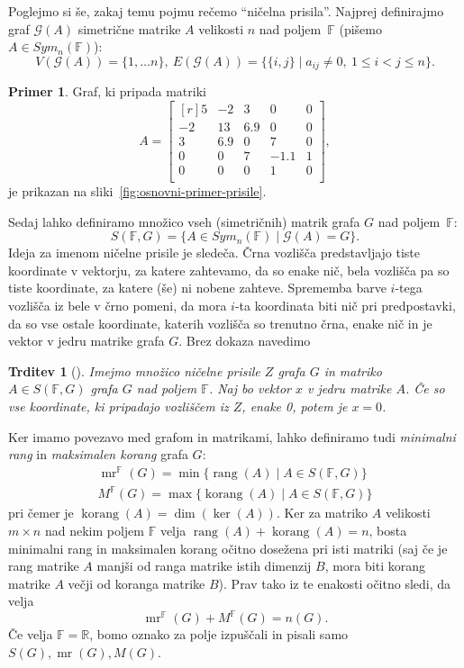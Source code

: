 \documentclass[12pt,a4paper,twoside]{article}
\theoremstyle{definition} %
\newtheorem{primer}[definicija]{Primer}
\theoremstyle{plain} %
\newtheorem{trditev}[definicija]{Trditev}
\numberwithin{equation}{section}  %
\newcommand{\R}{\mathbb R}
\newcommand{\F}{\mathbb F}
\renewcommand{\G}{\mathcal{G}}
\DeclareMathOperator{\mr}{mr}
\DeclareMathOperator{\rang}{rang}
\DeclareMathOperator{\korang}{korang}
\begin{document}
Poglejmo si še, zakaj temu pojmu rečemo ``ničelna prisila''. Najprej definirajmo graf $\G(A)$ simetrične matrike $A$ velikosti $n$ nad poljem~$\F$ (pišemo $A \in Sym_n(\F)$):
\[ V(\G(A)) = \{1, \ldots n\},\ E(\G(A)) = \{\{i,j\} \mid a_{ij} \neq 0,\ 1 \leq i < j \leq n \}. \]
\begin{primer}
    Graf, ki pripada matriki \[ A = \begin{bmatrix*}[r]
    5 & -2 & 3 & 0 & 0 \\
    -2 & 13 & 6.9 & 0 & 0 \\
    3 & 6.9 & 0 & 7 & 0 \\
    0 & 0 & 7 & -1.1 & 1 \\
    0 & 0 & 0 & 1 & 0 \\
    \end{bmatrix*},\] je prikazan na sliki~\ref{fig:osnovni-primer-prisile}.
\end{primer}
Sedaj lahko definiramo množico vseh (simetričnih) matrik grafa $G$ nad poljem~$\F$:
\[ S(\F, G) = \{A \in Sym_n(\F) \mid \G(A) = G \}. \]
Ideja za imenom ničelne prisile je sledeča. Črna vozlišča predstavljajo tiste koordinate v vektorju, za katere zahtevamo, da so enake nič, bela vozlišča pa so tiste koordinate, za katere (še) ni nobene zahteve. Sprememba barve $i$-tega vozlišča iz bele v črno pomeni, da mora $i$-ta koordinata biti nič pri predpostavki, da so vse ostale koordinate, katerih vozlišča so trenutno črna, enake nič in je vektor v jedru matrike grafa $G$. Brez dokaza navedimo
\begin{trditev}[{\cite[trditev 2.3]{aim2008minimumrank}}]
    \label{trd:rang2}
    Imejmo množico ničelne prisile $Z$ grafa $G$ in matriko $A \in S(\F, G)$ grafa $G$ nad poljem $\F$. Naj bo vektor $x$ v jedru matrike $A$. Če so vse koordinate, ki pripadajo vozliščem iz $Z$, enake 0, potem je $x = 0$.
\end{trditev}

Ker imamo povezavo med grafom in matrikami, lahko definiramo tudi \emph{minimalni rang} in \emph{maksimalen korang} grafa $G$:
\begin{gather*}
    \mr^\F(G) = \min \{ \rang(A) \mid A \in S(\F, G) \} \\
    M^\F(G) = \max \{ \korang(A) \mid A \in S(\F, G) \}
\end{gather*}
pri čemer je $\korang(A) = \dim(\ker(A))$. Ker za matriko $A$ velikosti $m \times n$ nad nekim poljem $\F$ velja $\rang(A) + \korang(A) = n$, bosta minimalni rang in maksimalen korang očitno dosežena pri isti matriki (saj če je rang matrike $A$ manjši od ranga matrike istih dimenzij $B$, mora biti korang matrike $A$ večji od koranga matrike $B$). Prav tako iz te enakosti očitno sledi, da velja
\begin{equation}
    \label{eq:mr+m=n}
    \mr^\F(G) + M^\F(G) = n(G).
\end{equation}
Če velja $\F = \R$, bomo oznako za polje izpuščali in pisali samo $S(G), \mr(G), M(G)$.
\end{document}
